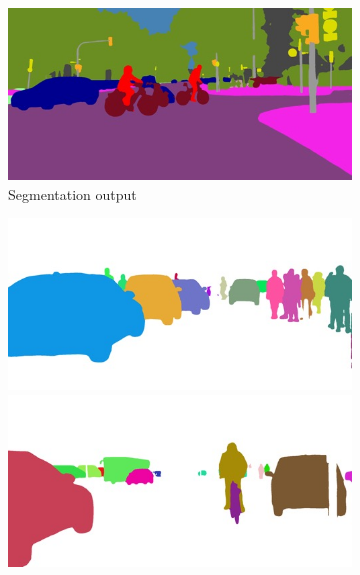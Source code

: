 \begin{figure}[t]
{\begin{subfigure}[t]{0.24\linewidth}
\begin{center}
		\includegraphics[width=\linewidth,trim={0px 60px 0 0px},clip]{qualitative/munich_000042_000019_semantic_segmentation_rgb.jpg}
  \caption{Segmentation output}
\end{center}
\end{subfigure}
\begin{subfigure}[t]{0.24\linewidth}
\begin{center}
		\includegraphics[width=\linewidth,trim={0px 60px 0 0px},clip]{qualitative/bielefeld_000000_026550_instance_segmentation.jpg}
		\includegraphics[width=\linewidth,trim={0px 60px 0 0px},clip]{qualitative/bonn_000045_000019_instance_segmentation.jpg}

\end{center}
\end{subfigure}}
\end{figure}
